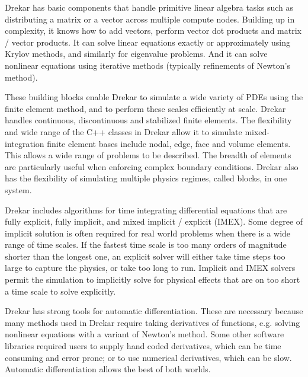 \documentclass[11pt]{article} %
\begin{document}
Drekar has basic components that handle primitive linear algebra tasks such as 
distributing a matrix or a vector across multiple compute nodes.
Building up in complexity, it knows how to add vectors,
perform vector dot products and matrix / vector products.
It can solve linear equations exactly or approximately using Krylov methods,
and similarly for eigenvalue problems.
And it can solve nonlinear equations using iterative methods
(typically refinements of Newton's method).

These building blocks enable Drekar to simulate a wide variety of PDEs
using the finite element method, and to perform these scales efficiently at scale.
Drekar handles continuous, discontinuous and stabilized finite elements.
The flexibility and wide range of the C++ classes in Drekar allow it to simulate
mixed-integration finite element bases include nodal, edge, face and volume elements.
This allows a wide range of problems to be described.
The breadth of elements are particularly useful when enforcing complex boundary conditions.
Drekar also has the flexibility of simulating multiple physics regimes, called blocks, in one system.

Drekar includes algorithms for time integrating differential equations that are 
fully explicit, fully implicit, and mixed implicit / explicit (IMEX).  
Some degree of implicit solution is often required for real world problems
when there is a wide range of time scales.  If the fastest time scale
is too many orders of magnitude shorter than the longest one,
an explicit solver will either take time steps too large to capture the physics,
or take too long to run.  
Implicit and IMEX solvers permit the simulation to implicitly solve for physical
effects that are on too short a time scale to solve explicitly.

Drekar has strong tools for automatic differentiation.
These are necessary because many methods used in Drekar require
taking derivatives of functions, e.g. solving nonlinear equations with a variant of Newton's method.  
Some other software libraries required users to supply hand coded derivatives, 
which can be time consuming and error prone;
or to use numerical derivatives, which can be slow.
Automatic differentiation allows the best of both worlds.
\end{document}
